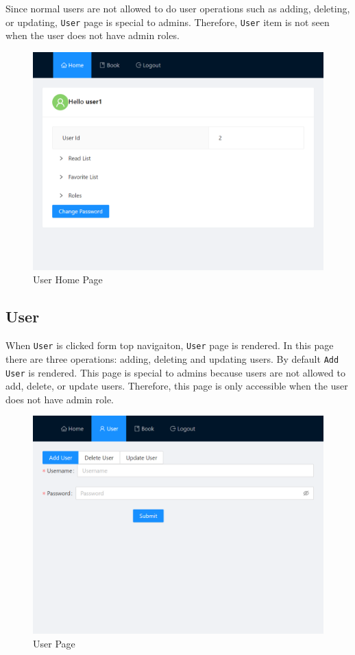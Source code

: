Since normal users are not allowed to do user operations such as adding, deleting, or updating, \texttt{User} page is special to admins. Therefore, \texttt{User} item is not seen when the user does not have admin roles.

\begin{figure}[H]
  \centering
  \includegraphics[width=\textwidth]{img/front-end/homepage-user.png}
  \caption{User Home Page}
\end{figure}


\subsection{User}

When \texttt{User} is clicked form top navigaiton, \texttt{User} page is rendered. In this page there are three operations: adding, deleting and updating users. By default \texttt{Add User} is rendered. This page is special to admins because users are not allowed to add, delete, or update users. Therefore, this page is only accessible when the user does not have admin role.

\begin{figure}[H]
  \centering
  \includegraphics[width=\textwidth]{img/front-end/user.png}
  \caption{User Page}
\end{figure}

